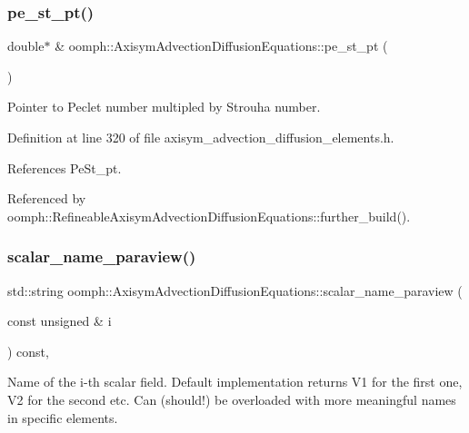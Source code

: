 \subsubsection{\texorpdfstring{pe\+\_\+st\+\_\+pt()}{pe\_st\_pt()}}
{\footnotesize\ttfamily double$\ast$ \& oomph\+::\+Axisym\+Advection\+Diffusion\+Equations\+::pe\+\_\+st\+\_\+pt (\begin{DoxyParamCaption}{ }\end{DoxyParamCaption})\hspace{0.3cm}{\ttfamily [inline]}}



Pointer to Peclet number multipled by Strouha number. 



Definition at line 320 of file axisym\+\_\+advection\+\_\+diffusion\+\_\+elements.\+h.



References Pe\+St\+\_\+pt.



Referenced by oomph\+::\+Refineable\+Axisym\+Advection\+Diffusion\+Equations\+::further\+\_\+build().

\mbox{\label{classoomph_1_1AxisymAdvectionDiffusionEquations_aef90d6d8a1262ae8caab9cd571b61392}} 
\subsubsection{\texorpdfstring{scalar\+\_\+name\+\_\+paraview()}{scalar\_name\_paraview()}}
{\footnotesize\ttfamily std\+::string oomph\+::\+Axisym\+Advection\+Diffusion\+Equations\+::scalar\+\_\+name\+\_\+paraview (\begin{DoxyParamCaption}\item[{const unsigned \&}]{i }\end{DoxyParamCaption}) const\hspace{0.3cm}{\ttfamily [inline]}, {\ttfamily [virtual]}}



Name of the i-\/th scalar field. Default implementation returns V1 for the first one, V2 for the second etc. Can (should!) be overloaded with more meaningful names in specific elements. 



